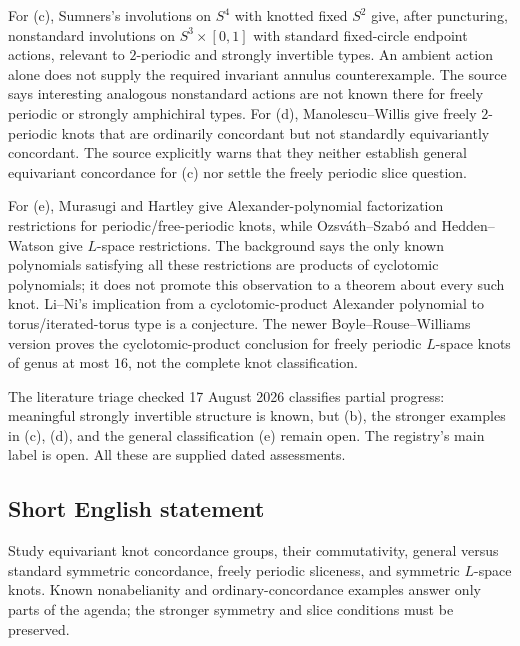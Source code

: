 \documentclass[11pt]{article}
\begin{document}
For (c), Sumners's involutions on $S^4$ with knotted fixed $S^2$ give, after puncturing, nonstandard involutions on $S^3\times[0,1]$ with standard fixed-circle endpoint actions, relevant to $2$-periodic and strongly invertible types. An ambient action alone does not supply the required invariant annulus counterexample. The source says interesting analogous nonstandard actions are not known there for freely periodic or strongly amphichiral types. For (d), Manolescu--Willis give freely $2$-periodic knots that are ordinarily concordant but not standardly equivariantly concordant. The source explicitly warns that they neither establish general equivariant concordance for (c) nor settle the freely periodic slice question.

For (e), Murasugi and Hartley give Alexander-polynomial factorization restrictions for periodic/free-periodic knots, while Ozsv\'ath--Szab\'o and Hedden--Watson give $L$-space restrictions. The background says the only known polynomials satisfying all these restrictions are products of cyclotomic polynomials; it does not promote this observation to a theorem about every such knot. Li--Ni's implication from a cyclotomic-product Alexander polynomial to torus/iterated-torus type is a conjecture. The newer Boyle--Rouse--Williams version proves the cyclotomic-product conclusion for freely periodic $L$-space knots of genus at most $16$, not the complete knot classification.

The literature triage checked 17 August 2026 classifies partial progress: meaningful strongly invertible structure is known, but (b), the stronger examples in (c), (d), and the general classification (e) remain open. The registry's main label is open. All these are supplied dated assessments.
\subsection{Short English statement}
Study equivariant knot concordance groups, their commutativity, general versus standard symmetric concordance, freely periodic sliceness, and symmetric $L$-space knots. Known nonabelianity and ordinary-concordance examples answer only parts of the agenda; the stronger symmetry and slice conditions must be preserved.
\end{document}
